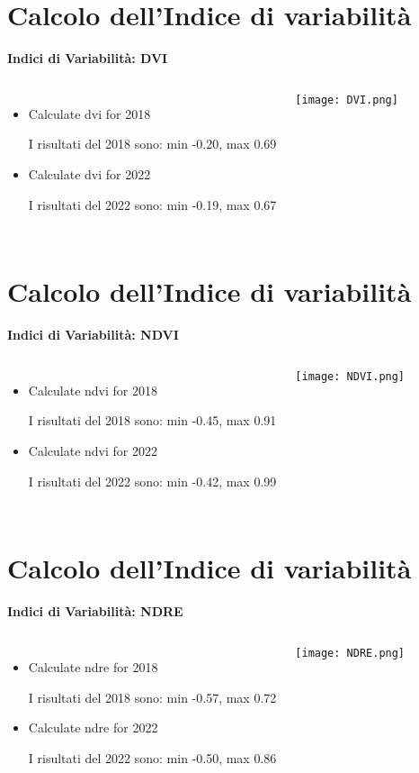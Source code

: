 \documentclass{beamer}
\begin{document}
\section{Calcolo dell'Indice di variabilità}

\begin{frame} 
{\Large\textbf{Indici di Variabilità: DVI}}
\begin{columns}
\begin{itemize}
\item Calculate dvi for 2018


I risultati del 2018 sono: min -0.20, max 0.69
\item Calculate dvi for 2022


I risultati del 2022 sono: min -0.19, max 0.67
\end{itemize}
    \texttt{[image: DVI.png]}
    \label{Fig: DVI_2018-2022}
\end{columns}
\end{frame}

\section{Calcolo dell'Indice di variabilità}

\begin{frame} 
{\Large\textbf{Indici di Variabilità: NDVI}}
\begin{columns}
\begin{itemize}
\item Calculate ndvi for 2018


I risultati del 2018 sono: min -0.45, max 0.91
\item Calculate ndvi for 2022


I risultati del 2022 sono: min -0.42, max 0.99
\end{itemize}
    \texttt{[image: NDVI.png]}
    \label{Fig: NDVI_2018-2022}
\end{columns}    
\end{frame}

\section{Calcolo dell'Indice di variabilità}

\begin{frame} 
{\Large\textbf{Indici di Variabilità: NDRE}}
\begin{columns}
\begin{itemize}
\item Calculate ndre for 2018


I risultati del 2018 sono: min -0.57, max 0.72
\item Calculate ndre for 2022


I risultati del 2022 sono: min -0.50, max 0.86
\end{itemize}
    \texttt{[image: NDRE.png]}
    \label{Fig: NDRE_2018-2022}
\end{columns}  
\end{frame}
\end{document}
